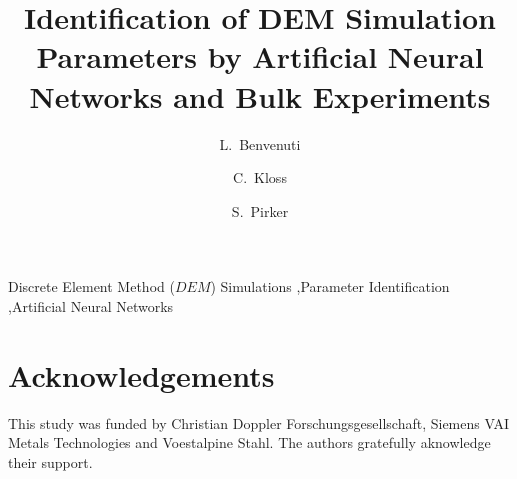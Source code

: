 \documentclass[review]{elsarticle}
\begin{document}
\begin{frontmatter}

\title{Identification of DEM Simulation Parameters by Artificial Neural Networks
and Bulk Experiments}

\author[jku]{L.~Benvenuti}

\author[dcs]{C.~Kloss}

\author[jku]{S.~Pirker}


\address[jku]{Johannes Kepler University Linz, Department on Particulate Flow
Modelling, Altenbergerstrasse 69, 4040, Linz, Austria}

\address[dcs]{DCS Computing GmbH, Altenbergerstr. 66a - Science Park, 4040 Linz,
Austria}



\begin{keyword}
Discrete Element Method ($DEM$) Simulations \sep Parameter Identification \sep Artificial Neural Networks
\end{keyword}
\end{frontmatter}





%




\section{Acknowledgements}
This study was funded by Christian Doppler Forschungsgesellschaft, Siemens VAI Metals Technologies and Voestalpine Stahl. The authors gratefully aknowledge their support.






\newpage


\newpage
%

\renewcommand\thefigure{\arabic{figure}}
\end{document}
